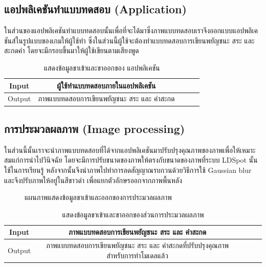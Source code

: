 \documentclass[12pt,oneside,openright,a4paper]{cpe-thai-project}
\begin{document}
\subsection{แอปพลิเคชันทำแบบทดสอบ (Application)}
ในส่วนของแอปพลิเคชันทำแบบทดสอบนั้นเพื่อที่จะได้มาซึ่งภาพแบบทดสอบเราจึงออกแบบแอปพลิเคชันส์ในรูปแบบของเกมให้ผู้ใช้ทำ ซึ่งในส่วนนี้ผู้ใช้จะต้องทำแบบทดสอบการเขียนพยัญชนะ สระ และสะกดคำ โดยจะมีกรอบขึ้นมาให้ผู้ใช้เขียนตามเสียงพูด 
\begin{table}[!h]\centering
  \caption{แสดงข้อมูลขาเข้าและขาออกของ แอปพลิเคชัน}\label{tbl:application1}
  \begin{tabular}{c|c|l|rr} \hline
  Input & ผู้ใช้ทำแบบทดสอบภายในแอปพลิเคชัน \\ \hline
  Output & ภาพแบบทดสอบการเขียนพยัญชนะ สระ และ คำสะกด \\ \hline
  \end{tabular}
  \end{table}

\subsection{การประมวลผลภาพ (Image processing)}
ในส่วนนี้นั้นเราจะนำภาพแบบทดสอบที่ได้จากแอปพลิเคชันมาปรับปรุงคุณภาพของภาพเพื่อให้เหมาะสมแก่การนำไปวินิจฉัย โดยจะมีการปรับขนาดของภาพให้ตรงกับขนาดของภาพที่ระบบ 
LDSpot นั้นใช้ในการเรียนรู้ หลังจากนั้นจึงนำภาพไปทำการลดสัญญาณรบกวนด้วยวิธีการใช้ Gaussian blur และจึงปรับภาพให้อยู่ในสีขาวดำ เพื่อแยกตัวอักษรออกจากภาพพื้นหลัง
\begin{figure}[!ht]\centering
  \setlength{\fboxrule}{0.2mm} %
  \setlength{\fboxsep}{1cm}
  \caption{แผนภาพแสดงข้อมูลขาเข้าและออกของการประมวลผลภาพ}\label{fig:system}
\end{figure}
\begin{table}[!h]\centering
  \caption{แสดงข้อมูลขาเข้าและขาออกของส่วนการประมวลผลภาพ}\label{tbl:application1}
  \begin{tabular}{c|c|l|rr} \hline
  Input & ภาพแบบทดสอบการเขียนพยัญชนะ สระ และ คำสะกด \\ \hline
  Output & ภาพแบบทดสอบการเขียนพยัญชนะ สระ และ คำสะกดที่ปรับปรุงคุณภาพสำหรับการทำโมเดลแล้ว \\ \hline
  \end{tabular}
  \end{table}
  
\end{document}
